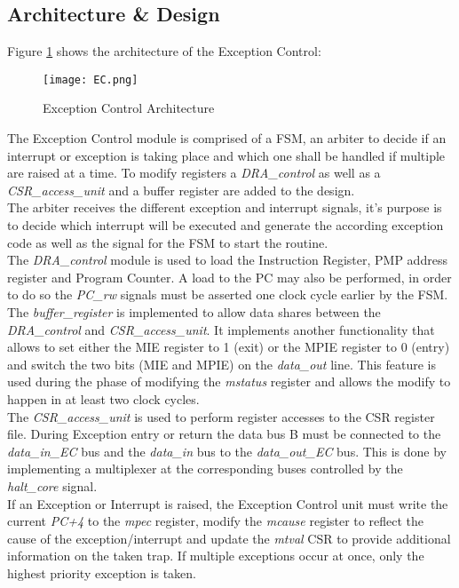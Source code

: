 \subsection{Architecture \& Design}
Figure \ref{fig:EC} shows the architecture of the Exception Control:
\begin{figure}[H]
	\centering
	\texttt{[image: EC.png]}
	\caption{Exception Control Architecture}
	\label{fig:EC}
\end{figure}
The Exception Control module is comprised of a FSM, an arbiter to decide if an
interrupt or exception is taking place and which one shall be handled if multiple are raised at a time. To modify registers a \textit{DRA\_control} as well as a \textit{CSR\_access\_unit} and a buffer register are added to the design.\\
The arbiter receives the different exception and interrupt signals, it’s purpose is to decide which interrupt will be executed and generate the according exception code
as well as the signal for the FSM to start the routine.\\
The \textit{DRA\_control} module is used to load the Instruction Register, PMP address register and Program Counter. A load to the PC may also be performed, in order to do so the \textit{PC\_rw} signals must be asserted one clock cycle earlier by the FSM.\\
The \textit{buffer\_register} is implemented to allow data shares between the \textit{DRA\_control} and \textit{CSR\_access\_unit}. It implements another functionality that allows to set either the MIE register to 1 (exit) or the MPIE register to 0 (entry) and switch the two bits (MIE and MPIE) on the \textit{data\_out} line. This feature is used during the phase of modifying the \textit{mstatus} register and allows the modify to happen in at least two clock
cycles.\\
The \textit{CSR\_access\_unit} is used to perform register accesses to the CSR register file. During Exception entry or return the data bus B must be connected to the
\textit{data\_in\_EC} bus and the \textit{data\_in} bus to the \textit{data\_out\_EC} bus. This is done by implementing a multiplexer at the corresponding buses controlled by the\textit{ halt\_core} signal.\\
If an Exception or Interrupt is raised, the Exception Control unit must write the
current \textit{PC+4} to the \textit{mpec} register, modify the \textit{mcause} register to reflect the cause of the exception/interrupt and update the \textit{mtval} CSR to provide additional information on the taken trap. If multiple exceptions occur at once, only the highest priority exception is taken.\\
